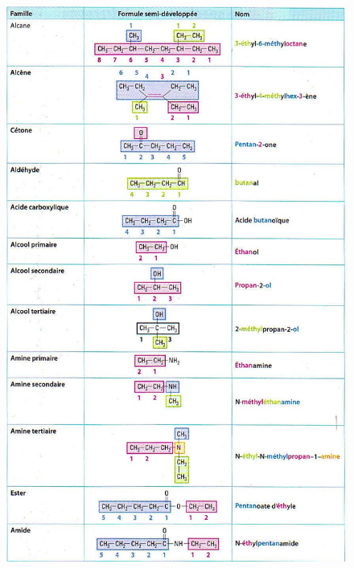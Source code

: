 \documentclass[11pt,a4paper]{article}
\begin{document}
\begin{figure}[h]
    \centering
    \includegraphics[width=.85\linewidth]{imgs/c5/recapgroupes.jpg}
\end{figure}
\end{document}
